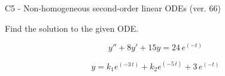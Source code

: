 \begin{exercise}
  \begin{exerciseTitle}C5 - Non-homogeneous second-order linear ODEs (ver. 66)\end{exerciseTitle}
  \begin{exerciseStatement}
    
Find the solution to the given ODE.

    
\[y''+8y'+15y = 24 \, e^{\left(-t\right)}\]

  \end{exerciseStatement}
  \begin{exerciseAnswer}
    
\[y= k_{1} e^{\left(-3 \, t\right)} + k_{2} e^{\left(-5 \, t\right)} + 3 \, e^{\left(-t\right)}\]

  \end{exerciseAnswer}
\end{exercise}